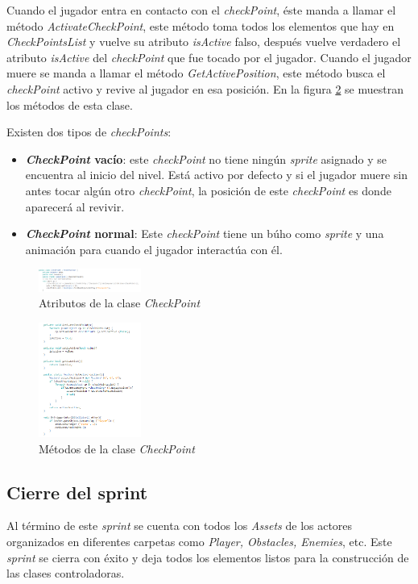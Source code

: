 Cuando el jugador entra en contacto con el \textit{checkPoint}, éste manda a
llamar el método \textit{ActivateCheckPoint}, este método toma todos los
elementos que hay en  \textit{CheckPointsList} y vuelve su atributo
\textit{isActive} falso, después vuelve verdadero el atributo \textit{isActive}
del \textit{checkPoint} que fue tocado por el jugador. Cuando el jugador muere
se manda a llamar el  método \textit{GetActivePosition}, este método busca el
\textit{checkPoint} activo y revive al jugador en esa posición. En la figura
\ref{fig:CheckMethod} se muestran los métodos de esta clase.

Existen dos tipos de \textit{checkPoints}:
    \begin{itemize}
        \item \textbf{\textit{CheckPoint} vacío}: este \textit{checkPoint} no 
        tiene ningún
        \textit{sprite} asignado y se encuentra al inicio del nivel. Está activo 
        por defecto
        y si el jugador muere sin antes tocar algún otro \textit{checkPoint}, la
        posición de este \textit{checkPoint} es donde aparecerá al revivir.
        \item \textbf{\textit{CheckPoint} normal}: Este \textit{checkPoint} tiene un
        búho como \textit{sprite} y una animación para cuando el jugador interactúa con
        él.
    \end{itemize}
    
\begin{figure}[h]
                \centering
                \includegraphics[width=0.3\textwidth]{03TrabajoRealizado/imagenes/checkpoint.png}
                \caption{Atributos de la clase \textit{CheckPoint}}
                \label{fig:CheckAtri}    
\end{figure}

\begin{figure}[h]
                \centering
                \includegraphics[width=0.3\textwidth]{03TrabajoRealizado/imagenes/checkpointmethods.png}
                \caption{Métodos de la clase \textit{CheckPoint}}
                \label{fig:CheckMethod}    
\end{figure}

\subsection{Cierre del sprint}
Al término de este \textit{sprint} se cuenta con todos los \textit{Assets} de
los actores organizados en diferentes carpetas como \textit{Player, Obstacles, Enemies},
etc. Este \textit{sprint} se cierra con éxito y deja todos los elementos listos
para la construcción de las clases controladoras.